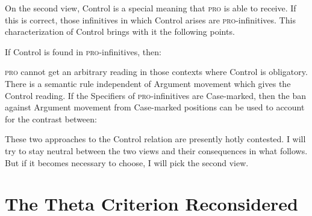On the second view, Control is a special meaning that \textsc{pro} is able to receive. If this is correct, those infinitives in which Control arises are \textsc{pro}-infinitives. This characterization of Control brings with it the following points.
\pagebreak
\begin{exe}
\ex \label{ex3:summlist3} If Control is found in \textsc{pro}-infinitives, then:
\begin{xlist}
	\ex \textsc{pro} cannot get an arbitrary reading in those contexts where Control is obligatory.
	\ex There is a semantic rule independent of Argument movement which gives the Control reading.
	\ex If the Specifiers of \textsc{pro}-infinitives are Case-marked, then the ban against Argument movement from Case-marked positions can be used to account for the contrast between:
	\begin{xlist}
\end{xlist}
\end{xlist}
\end{exe}

These two approaches to the Control relation are presently hotly contested. I will try to stay neutral between the two views and their consequences in what follows. But if it becomes necessary to choose, I will pick the second view.

\section{The Theta Criterion Reconsidered} %
\label{sec:reconsidered}


